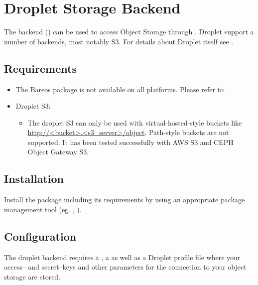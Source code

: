 \section{Droplet Storage Backend}
\label{SdBackendDroplet}

The  backend () can be used to access Object Storage through .
Droplet support a number of backends, most notably S3.
For details about Droplet itself see \externalReferenceDroplet.

\subsection{Requirements}

\begin{itemize}
  \item The Bareos package  is not available on all platforms. Please refer to .
  \item Droplet S3:
  \begin{itemize}
    \item The droplet S3 can only be used with virtual-hosted-style buckets like \url{http://<bucket>.<s3_server>/object}.
        Path-style buckets are not supported.
        It has  been tested successfully with AWS S3 and CEPH Object Gateway S3.
  \end{itemize}
\end{itemize}


\subsection{Installation}

Install the package  including its requirements
by using an appropriate package management tool
(eg. , ).





\subsection{Configuration}
The droplet backend requires a \bareosDir {}, a \bareosSd {} as well as a Droplet profile file where your access-- and secret--keys and other parameters for the connection to your object storage are stored.

